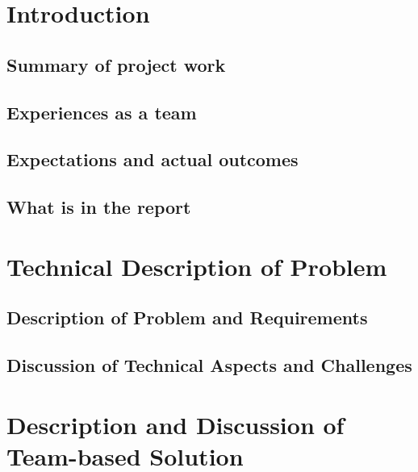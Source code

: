 \documentclass[a4paper]{report}
\begin{document}


\tableofcontents

\chapter{Introduction} 
\section{Summary of project work}
\section{Experiences as a team}
\section{Expectations and actual outcomes}
\section{What is in the report}

\chapter{Technical Description of Problem} 
\section{Description of Problem and Requirements}
\section{Discussion of Technical Aspects and Challenges}

\chapter{Description and Discussion of Team-based Solution} 
\end{document}
